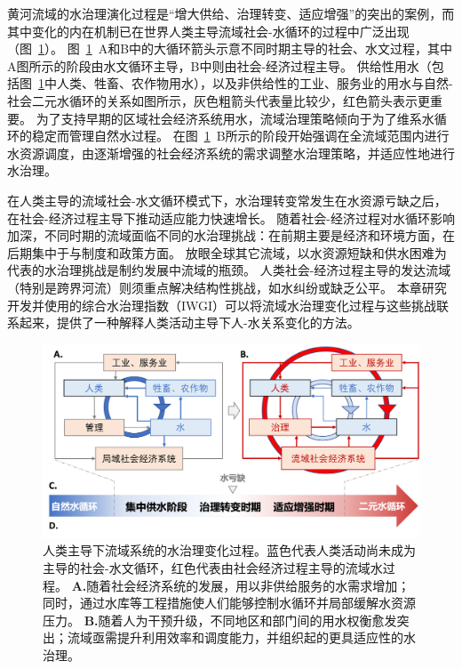 黄河流域的水治理演化过程是“增大供给、治理转变、适应增强”的突出的案例，而其中变化的内在机制已在世界人类主导流域社会-水循环的过程中广泛出现（图~\ref{fig:summary}）。
图~\ref{fig:summary}~A和B中的大循环箭头示意不同时期主导的社会、水文过程，其中A图所示的阶段由水文循环主导，B中则由社会-经济过程主导。
供给性用水（包括图~\ref{fig:summary}中人类、牲畜、农作物用水），以及非供给性的工业、服务业的用水与自然-社会二元水循环的关系如图所示，灰色粗箭头代表量比较少，红色箭头表示更重要。
为了支持早期的区域社会经济系统用水，流域治理策略倾向于为了维系水循环的稳定而管理自然水过程。
在图~\ref{fig:summary}~B所示的阶段开始强调在全流域范围内进行水资源调度，由逐渐增强的社会经济系统的需求调整水治理策略，并适应性地进行水治理。

在人类主导的流域社会-水文循环模式下，水治理转变常发生在水资源亏缺之后，在社会-经济过程主导下推动适应能力快速增长。
随着社会-经济过程对水循环影响加深，不同时期的流域面临不同的水治理挑战：在前期主要是经济和环境方面，在后期集中于与制度和政策方面。
放眼全球其它流域，以水资源短缺和供水困难为代表的水治理挑战是制约发展中流域的瓶颈\cite{allan2019,speed2013,liu2012a}。
人类社会-经济过程主导的发达流域（特别是跨界河流）则须重点解决结构性挑战，如水纠纷或缺乏公平\cite{mirumachi2015}。
本章研究开发并使用的综合水治理指数（IWGI）可以将流域水治理变化过程与这些挑战联系起来，提供了一种解释人类活动主导下人-水关系变化的方法。

\begin{figure}[!htbp]
	\includegraphics[width=\textwidth]{img/ch4/ch4_transition.png}
	\caption[人类主导下流域系统的水治理阶段过渡]{
		人类主导下流域系统的水治理变化过程。蓝色代表人类活动尚未成为主导的社会-水文循环，红色代表由社会经济过程主导的流域水过程。
        \textbf{A.}随着社会经济系统的发展，用以非供给服务的水需求增加；同时，通过水库等工程措施使人们能够控制水循环并局部缓解水资源压力。
        \textbf{B.}随着人为干预升级，不同地区和部门间的用水权衡愈发突出；流域亟需提升利用效率和调度能力，并组织起的更具适应性的水治理。
	}\label{fig:summary}
\end{figure}

